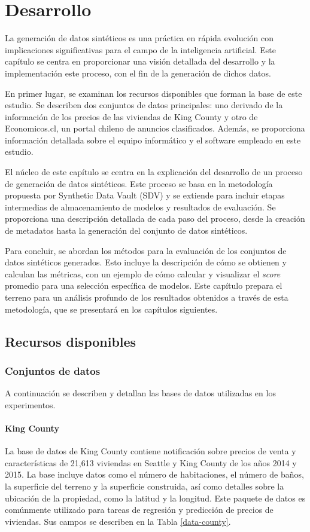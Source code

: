 \chapter{Desarrollo}
\label{chap:desarrollo}
La generación de datos sintéticos es una práctica en rápida evolución con implicaciones significativas para el campo de la inteligencia artificial. Este capítulo se centra en proporcionar una visión detallada del desarrollo y la implementación este proceso, con el fin de la generación de dichos datos.

En primer lugar, se examinan los recursos disponibles que forman la base de este estudio. Se describen dos conjuntos de datos principales: uno derivado de la información de los precios de las viviendas de King County y otro de Economicos.cl, un portal chileno de anuncios clasificados. Además, se proporciona información detallada sobre el equipo informático y el software empleado en este estudio.

El núcleo de este capítulo se centra en la explicación del desarrollo de un proceso de generación de datos sintéticos. Este proceso se basa en la metodología propuesta por Synthetic Data Vault (SDV) y se extiende para incluir etapas intermedias de almacenamiento de modelos y resultados de evaluación. Se proporciona una descripción detallada de cada paso del proceso, desde la creación de metadatos hasta la generación del conjunto de datos sintéticos.

Para concluir, se abordan los métodos para la evaluación de los conjuntos de datos sintéticos generados. Esto incluye la descripción de cómo se obtienen y calculan las métricas, con un ejemplo de cómo calcular y visualizar el \emph{score} promedio para una selección específica de modelos. Este capítulo prepara el terreno para un análisis profundo de los resultados obtenidos a través de esta metodología, que se presentará en los capítulos siguientes.

\section{Recursos disponibles}
\label{sec:recursos}
\subsection{Conjuntos de datos}
\label{subsec:datos}
A continuación se describen y detallan las bases de datos utilizadas en los experimentos.

\subsubsection{King County}
La base de datos de King County \cite{kaggle_house_2015} contiene notificación sobre precios de venta y características de 21,613 viviendas en Seattle y King County de los años 2014 y 2015. La base incluye datos como el número de habitaciones, el número de baños, la superficie del terreno y la superficie construida, así como detalles sobre la ubicación de la propiedad, como la latitud y la longitud. Este paquete de datos es comúnmente utilizado para tareas de regresión y predicción de precios de viviendas. Sus campos se describen en la Tabla \ref{data-county}.
 
